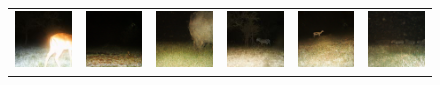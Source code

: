 \begin{figure}[htp!]
\begin{tabularx}{\textwidth}{>{\centering\arraybackslash}X >{\centering\arraybackslash}X >{\centering\arraybackslash}X >{\centering\arraybackslash}X >{\centering\arraybackslash}X >{\centering\arraybackslash}X}
        \includegraphics{gfx/unconditional-diffusion-sampling-qual/rgb_S2_B05_R2_IMAG0016.jpg} & \includegraphics{gfx/unconditional-diffusion-sampling-qual/cyclegan_S2_B06_R3_PICT3848_fake.png} & \includegraphics{gfx/unconditional-diffusion-sampling-qual/diffusion_S2_B06_R3_PICT3848.png} & \includegraphics{gfx/unconditional-diffusion-sampling-qual/rgb_S2_B05_R3_IMAG1018.jpg} & \includegraphics{gfx/unconditional-diffusion-sampling-qual/cyclegan_S2_B07_R1_PICT3274_fake.png} & \includegraphics{gfx/unconditional-diffusion-sampling-qual/diffusion_S2_B07_R1_PICT3274.png}

\end{tabularx}
\end{figure}

